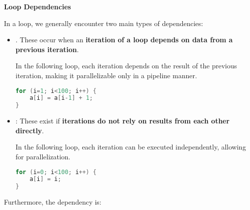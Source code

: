 \begin{flushleft}
    \textcolor{Green3}{ \textbf{Loop Dependencies}}
\end{flushleft}
In a loop, we generally encounter two main types of dependencies:
\begin{itemize}
    \item {}. These occur when an \textbf{iteration of a loop depends on data from a previous iteration}.
    
    \begin{examplebox}
        In the following loop, each iteration depends on the result of the previous iteration, making it parallelizable only in a pipeline manner.
        \begin{lstlisting}[language=c]
for (i=1; i<100; i++) {
    a[i] = a[i-1] + 1;
}\end{lstlisting}
    \end{examplebox}

    \item {}: These exist if \textbf{iterations do not rely on results from each other directly}.
    \begin{examplebox}
        In the following loop, each iteration can be executed independently, allowing for parallelization.
        \begin{lstlisting}[language=c]
for (i=0; i<100; i++) {
    a[i] = i;
}\end{lstlisting}
    \end{examplebox}
\end{itemize}
Furthermore, the dependency is:
